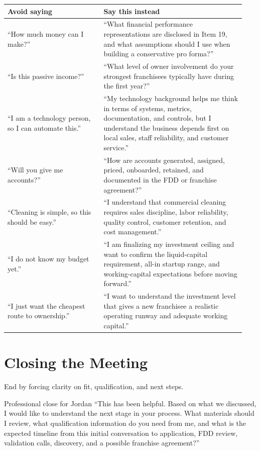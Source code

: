 \documentclass[11pt]{article}
\begin{document}
\begin{longtable}{>{\raggedright\arraybackslash}p{0.38\linewidth}>{\raggedright\arraybackslash}p{0.56\linewidth}}
\toprule
\textbf{Avoid saying} & \textbf{Say this instead} \\
\midrule
``How much money can I make?'' & ``What financial performance representations are disclosed in Item 19, and what assumptions should I use when building a conservative pro forma?'' \\
``Is this passive income?'' & ``What level of owner involvement do your strongest franchisees typically have during the first year?'' \\
``I am a technology person, so I can automate this.'' & ``My technology background helps me think in terms of systems, metrics, documentation, and controls, but I understand the business depends first on local sales, staff reliability, and customer service.'' \\
``Will you give me accounts?'' & ``How are accounts generated, assigned, priced, onboarded, retained, and documented in the FDD or franchise agreement?'' \\
``Cleaning is simple, so this should be easy.'' & ``I understand that commercial cleaning requires sales discipline, labor reliability, quality control, customer retention, and cost management.'' \\
``I do not know my budget yet.'' & ``I am finalizing my investment ceiling and want to confirm the liquid-capital requirement, all-in startup range, and working-capital expectations before moving forward.'' \\
``I just want the cheapest route to ownership.'' & ``I want to understand the investment level that gives a new franchisee a realistic operating runway and adequate working capital.'' \\
\bottomrule
\end{longtable}

\section{Closing the Meeting}

End by forcing clarity on fit, qualification, and next steps.

\begin{scriptbox}{Professional close for Jordan}
``This has been helpful. Based on what we discussed, I would like to understand the next stage in your process. What materials should I review, what qualification information do you need from me, and what is the expected timeline from this initial conversation to application, FDD review, validation calls, discovery, and a possible franchise agreement?''
\end{scriptbox}
\end{document}
